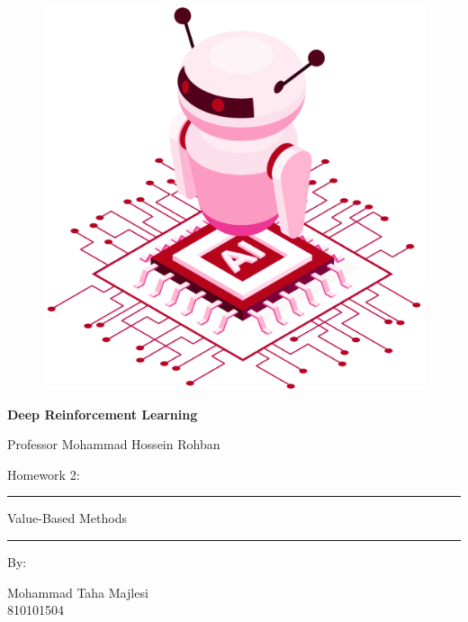 \documentclass[12pt]{article}
\begin{document}
\thispagestyle{plain}

\begin{center}

\vspace*{-1.5cm}
\begin{figure}[!h]
    \centering
    \includegraphics[width=0.7\linewidth]{figs/cover-std.png}
\end{figure}

{

{\color{DarkBlue} {\fontsize{30}{50} \textbf{
Deep Reinforcement Learning
}}}

{\color{DarkBlue} {\Large
Professor Mohammad Hossein Rohban
}}
}


\vspace{20pt}

{


{\color{RedOrange}
{\Large
Homework 2:
}\\
}
{\color{BrickRed}
\rule{12cm}{0.5pt}

{\Huge
Value-Based Methods
}
\rule{12cm}{0.5pt}
}

\vspace{10pt}

{\color{RoyalPurple} { \small By:} } \\
\vspace{10pt}

{\color{Blue} { \LARGE Mohammad Taha Majlesi } } \\
\vspace{5pt}
{\color{RoyalBlue} { \Large 810101504 } }


}
\end{center}
\end{document}
